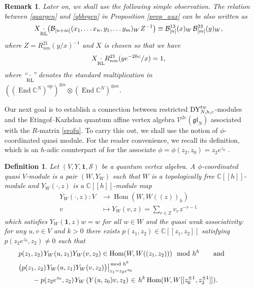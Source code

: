 \documentclass[12pt,a4paper,reqno]{amsart}
\theoremstyle{stil}
\theoremstyle{defi}
\newtheorem{defn}[thm]{Definition}
\theoremstyle{defi}
\newtheorem{rem}[thm]{Remark}
\theoremstyle{stil}
\theoremstyle{stil}
\theoremstyle{stil}
\theoremstyle{prim}
\newcommand{\modd}{ \,{\rm mod\,\,}}
\newcommand{\Fand}{\qquad\text{and}\qquad}
\newcommand{\ot}{\otimes}
\newcommand{\ts}{\hspace{1pt}}
\newcommand{\ndo}{\mathop{\mathrm{End}}}
\newcommand{\om}{\mathop{\mathrm{Hom}}}
\newcommand{\dyho}{{\rm DY}_{N,h,c}^{tw}  }
\newcommand{\vac}{ \mathrm{\boldsymbol{1}}}
\newcommand{\CC}{\mathbb{C}}
\newcommand{\Sc}{\mathcal{S}}
\newcommand{\Vc}{\mathcal{V}^{2c}(\mathfrak{gl}_N)}
\newcommand{\bc}{\mathcal{B}}
\newcommand{\cdotrl}{\mathop{\hspace{-2pt}\underset{\text{RL}}{\cdot}\hspace{-2pt}}}
\begin{document}
\begin{rem}\label{rem_AB}
Later on, we shall use the following simple observation. The   relation between \eqref{qaargen} and  \eqref{qbbrgen} in Proposition \ref{prop_aux} can be  also written as
	$$
	X\cdotrl\left(\bc_{[n+m]}(x_1,\ldots x_n,y_1,\ldots y_m)_W\ts Z^{-1}\right)
	\equiv  \bc_{[n]}^{13}(x)_W\ts   \bc_{[m]}^{23}(y)_W,
	$$
	where
	$Z=R_{nm}^{21}(y/x)^{-1}$
	and $X$ is chosen so that we have
	$$
	X\cdotrl R_{nm}^{21}(ye^{-2hc}/x)=1,
	$$
	where  ``$\cdotrl$'' denotes the standard multiplication in $((\ndo\CC^N)^{\text{op}})^{\ot n}\ot(\ndo\CC^N)^{\ot m}$.

	
\end{rem}
 



Our next goal is to establish a connection between restricted $\dyho$-modules and the Etingof--Kazhdan quantum affine vertex algebra $\Vc$ \cite[Thm. 2.3]{EK} associated with the  $R$-matrix   \eqref{erofu}. To carry this out, we shall use 
 the notion of $\phi$-coordinated quasi  module. For the reader convenience, we recall its definition, which is  
  an $h$-adic counterpart of \cite[Def. 3.4]{Liphi} for the associate $\phi=\phi(z_2,z_0)=z_2 e^{z_0}$ . 

\begin{defn}\label{def_ver12}
Let $(V,Y,\vac,\Sc)$ be a quantum vertex algebra.
A {\em $\phi$-coordinated quasi $V$-module} is a pair $(W,Y_W)$ such that $W$ is a topologically free $\CC[[h]]$-module and $ Y_W(\cdot, z) $ is  a $\mathbb{C}[[h]]$-module map
\begin{align*}
Y_W(\cdot, z) \colon V &\to \om(W,W((z))_h)\\
v &\mapsto Y_W(v,z)   =\sum_{r\in\mathbb{Z}} v_r   \ts z^{-r-1} 
\end{align*}
which satisfies  
 $ Y_W(\vac,z)w=w$ for all $w\in W$
and the {\em  quasi weak associativity}: for any $u,v\in V$ and $k>0$ there exists $p(z_1,z_2)\in\CC[[z_1,z_2]]$ satisfying $p(z_2 e^{z_0},z_2  )\neq 0$ such that
\begin{align}
&p(z_1,z_2) \ts Y_W(u,z_1)Y_W(v,z_2)\in\om (W,W((z_1,z_2)) )\mod h^k\Fand\label{qwassoc1}\\
&\big(p(z_1,z_2) \ts Y_W(u,z_1)Y_W(v,z_2)\big)\big|_{z_1= z_2e^{z_0}}^{\modd h^k}  \big. \label{qwassoc2qwassoc2} \\
&\qquad- p(z_2 e^{z_0},z_2  )\ts Y_W\left(Y(u,z_0)v,z_2\right)\ts
\in\ts  h^k \om(W,W[[z_0^{\pm 1},z_2^{\pm 1}]]).  \label{qwassoc2}
\end{align}
\end{defn}
\end{document}
